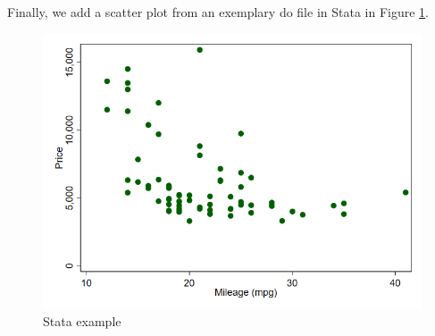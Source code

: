 \documentclass[12pt]{article}
\theoremstyle{definition}
\begin{document}
Finally, we add a scatter plot from an exemplary do file in Stata in Figure \ref{fig:auto_scatter}.

\begin{figure}[tbh!]
\centering
\includegraphics[width=.8\linewidth]{application/scatter.png}
\caption[]{Stata example}
\label{fig:auto_scatter}
\end{figure}



%

\end{document}
